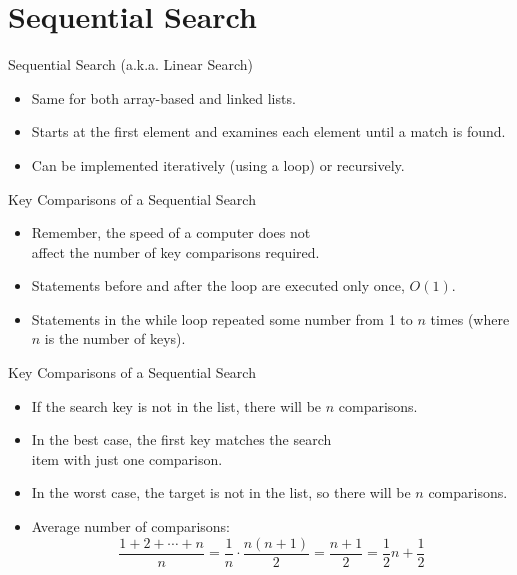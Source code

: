 \documentclass[14pt,aspectratio=1610]{beamer}
\begin{document}
\section{Sequential Search}

\begin{frame}{Sequential Search (a.k.a. Linear Search)}
\begin{itemize}
  \item
    Same for both array-based and linked lists.
  \item
    Starts at the first element and examines each element until a match is found.
  \item
    Can be implemented iteratively (using a loop) or recursively.
\end{itemize}
\end{frame}

\begin{frame}{Key Comparisons of a Sequential Search}
\begin{itemize}[<+->]
  \item
    Remember, the speed of a computer does not\\ affect the number of key comparisons required.
  \item
    Statements before and after the loop are executed only once, \(O(1)\).
  \item
    Statements in the while loop repeated some number from 1 to \(n\) times (where \(n\) is the number of keys).
\end{itemize}
\end{frame}

\begin{frame}{Key Comparisons of a Sequential Search}
\begin{itemize}[<+->]
  \item
    If the search key is not in the list, there will be \(n\) comparisons.
  \item
    In the best case, the first key matches the search\\ item with just one comparison.
  \item
    In the worst case, the target is not in the list, so there will be \(n\) comparisons.
  \item
    Average number of comparisons:
    \begin{equation*}
      \frac{1 + 2 + \cdots + n}{n} = \frac{1}{n} \cdot \frac{n (n + 1)}{2} = \frac{n + 1}{2} = \frac{1}{2}n + \frac{1}{2}
    \end{equation*}
\end{itemize}
\end{frame}
\end{document}
